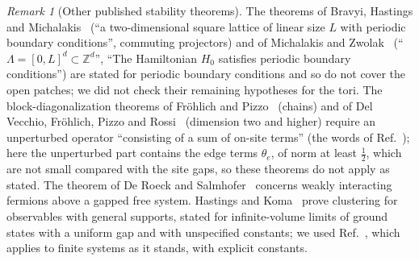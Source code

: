 \documentclass[aps,prx,onecolumn,10pt,nofootinbib,longbibliography,floatfix]{revtex4-2}
\theoremstyle{remark}
\newtheorem*{remark}{Remark}
\begin{document}
\begin{remark}[Other published stability theorems]
The theorems of Bravyi, Hastings and Michalakis~\cite{bravyi2010} (``a two-dimensional square lattice of linear size
$L$ with periodic boundary conditions'', commuting projectors) and of Michalakis and Zwolak~\cite{michalakis2013}
(``$\Lambda=[0,L]^d\subset\mathbb Z^d$'', ``The Hamiltonian $H_0$ satisfies periodic boundary conditions'') are
stated for periodic boundary conditions and so do not cover the open patches; we did not check their
remaining hypotheses for the tori. The block-diagonalization theorems of Fr\"ohlich and Pizzo~\cite{frohlich2020} (chains) and
of Del Vecchio, Fr\"ohlich, Pizzo and Rossi~\cite{delvecchio2022} (dimension two and higher) require an unperturbed
operator ``consisting of a sum of on-site terms'' (the words of Ref.~\cite{delvecchio2022}); here the unperturbed part contains the edge terms $\theta_e$, of
norm at least $\frac12$, which are not small compared with the site gaps, so these theorems do not apply as stated.
The theorem of De Roeck and Salmhofer~\cite{deroeck2019} concerns weakly interacting fermions above a gapped free
system. Hastings and Koma~\cite{hastings2006} prove clustering for observables with general supports, stated for
infinite-volume limits of ground states with a uniform gap and with unspecified constants; we used
Ref.~\cite{nachtergaele2006}, which applies to finite systems as it stands, with explicit constants.
\end{remark}
\end{document}
